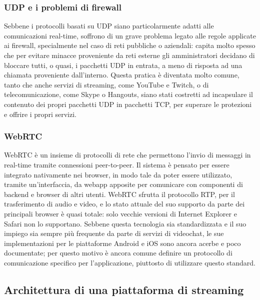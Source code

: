 		\subsubsection{UDP e i problemi di firewall}
			Sebbene i protocolli basati su \gls{UDP} siano particolarmente adatti alle comunicazioni real-time, soffrono di un grave problema legato alle regole applicate ai firewall, specialmente nel caso di reti pubbliche o aziendali: capita molto spesso che per evitare minacce proveniente da reti esterne gli amministratori decidano di bloccare tutti, o quasi, i pacchetti UDP in entrata, a meno di risposta ad una chiamata proveniente dall'interno. Questa pratica è diventata molto comune, tanto che anche servizi di streaming, come YouTube e Twitch, o di telecomunicazione, come Skype o Hangouts, siano stati costretti ad incapsulare il contenuto dei propri pacchetti \gls{UDP} in pacchetti \gls{TCP}, per superare le protezioni e offrire i propri servizi.

		\subsubsection{WebRTC}
			WebRTC è un insieme di protocolli di rete che permettono l'invio di messaggi in real-time tramite connessioni peer-to-peer. Il sistema è pensato per essere integrato nativamente nei browser, in modo tale da poter essere utilizzato, tramite un'interfaccia, da webapp apposite per comunicare con componenti di backend e browser di altri utenti. WebRTC sfrutta il protocollo \gls{RTP}, per il trasferimento di audio e video, e lo stato attuale del suo supporto da parte dei principali browser è quasi totale: solo vecchie versioni di Internet Explorer e Safari non lo supportano. Sebbene questa tecnologia sia standardizzata e il suo impiego sia sempre più frequente da parte di servizi di videochat, le sue implementazioni per le piattaforme Android e iOS sono ancora acerbe e poco documentate; per questo motivo è ancora comune definire un protocollo di comunicazione specifico per l'applicazione, piuttosto di utilizzare questo standard.

	\subsection{Architettura di una piattaforma di streaming}
